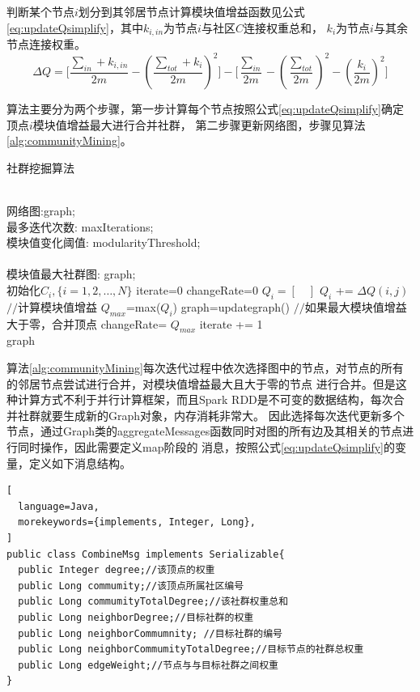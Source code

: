 判断某个节点$i$划分到其邻居节点计算模块值增益函数见公式\eqref{eq:updateQsimplify}，其中$k_{i,in}$为节点$i$与社区$C$连接权重总和，
$k_i$为节点$i$与其余节点连接权重。
\begin{equation}
\label{eq:updateQsimplify}
\Delta Q=\big[ \frac{\sum_{in} + k_{i,in}}{2m} -(\frac{\sum_{tot}+k_i}{2m})^2 \big] 
      - \big[ \frac{\sum_{in}}{2m} - (\frac{\sum_{tot}}{2m})^2 - (\frac{k_i}{2m})^2 \big]
\end{equation}

算法主要分为两个步骤，第一步计算每个节点按照公式\eqref{eq:updateQsimplify}确定顶点$i$模块值增益最大进行合并社群，
第二步骤更新网络图，步骤见算法\ref{alg:communityMining}。
\begin{algorithm}[htbp]
\caption{社群挖掘算法}
\label{alg:communityMining}
\begin{algorithmic}[1]
\REQUIRE ~~\\
网络图:graph; \\
最多迭代次数: maxIterations;\\
模块值变化阈值: modularityThreshold;\\
\ENSURE ~~\\
模块值最大社群图: graph; \\
\STATE 初始化$C_i,\{i=1, 2,\ldots , N\}$
\STATE iterate=0
    \STATE changeRate=0
    \STATE $Q_i=[\quad ]$
    	\STATE $Q_i$ += $\Delta Q(i,j)$ $//$计算模块值增益
    \ENDFOR
    \STATE $Q_{max}$=max($Q_i$)
    	\STATE graph=updategraph() $//$如果最大模块值增益大于零，合并顶点
	\STATE changeRate= $Q_{max}$
    \ENDIF
    \ENDFOR
 \STATE iterate += 1 \\
\ENDWHILE
\RETURN graph
\end{algorithmic}
\end{algorithm}

算法\ref{alg:communityMining}每次迭代过程中依次选择图中的节点，对节点的所有的邻居节点尝试进行合并，对模块值增益最大且大于零的节点
进行合并。但是这种计算方式不利于并行计算框架，而且Spark RDD是不可变的数据结构，每次合并社群就要生成新的Graph对象，内存消耗非常大。
因此选择每次迭代更新多个节点，通过Graph类的aggregateMessages函数同时对图的所有边及其相关的节点进行同时操作，因此需要定义map阶段的
消息，按照公式\eqref{eq:updateQsimplify}的变量，定义如下消息结构。
\begin{lstlisting}[
  language=Java,
  morekeywords={implements, Integer, Long},
]
public class CombineMsg implements Serializable{
  public Integer degree;//该顶点的权重
  public Long commumity;//该顶点所属社区编号
  public Long commumityTotalDegree;//该社群权重总和
  public Long neighborDegree;//目标社群的权重
  public Long neighborCommumnity; //目标社群的编号
  public Long neighborCommumityTotalDegree;//目标节点的社群总权重
  public Long edgeWeight;//节点与与目标社群之间权重
}
\end{lstlisting}

